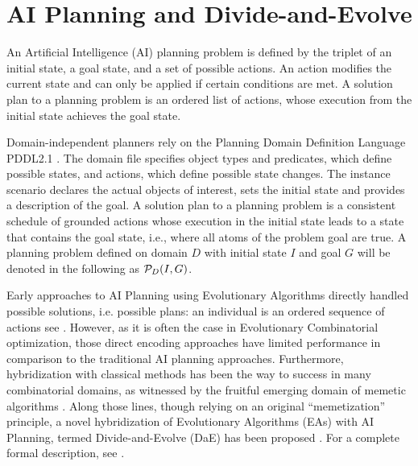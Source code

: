 \documentclass[runningheads,a4paper]{llncs}
\begin{document}
\section{AI Planning and Divide-and-Evolve}
\label{section:planning}

An Artificial Intelligence (AI) planning problem is defined by the triplet of an initial state, a goal state, and a set of possible actions. An action modifies the current state and can only be applied if certain conditions are met. A solution plan to a planning problem is an ordered list of actions, whose execution from the initial state achieves the goal state. 

Domain-independent planners rely on the Planning Domain Definition Language PDDL2.1 \cite{Fox-JAIR-2003}. The domain file specifies object types and predicates, which define possible states, and actions, which define possible state changes. The instance scenario declares the actual objects of interest, sets the initial state and provides a description of the goal. A solution plan to a planning problem is a consistent schedule of grounded actions whose execution in the initial state leads to a state that contains the goal state, i.e., where all atoms of the problem goal are true. A planning problem defined on domain $D$ with initial state $I$ and goal $G$ will be denoted in the following as ${\cal P}_D(I,G)$.

Early approaches to AI Planning using Evolutionary Algorithms directly handled possible solutions, i.e. possible plans: an individual is an ordered sequence of actions see \cite{Spector-AAAI-94,muslea97,westerberg:2000,westerberg:2001,Morignot-2005}. However, as it is often the case in Evolutionary Combinatorial optimization, those direct encoding approaches have limited performance in comparison to the traditional AI planning approaches. Furthermore, hybridization with classical methods has been the way to success in many combinatorial domains, as witnessed by the fruitful emerging domain of memetic algorithms \cite{MemeticBook:2005}. Along those lines, though relying on an original ``memetization'' principle, a novel hybridization of Evolutionary Algorithms (EAs) with AI Planning, termed Divide-and-Evolve (DaE) has been proposed \cite{DAE:EvoCOP06,DAE:book-2007}. For a complete formal description, see \cite{Bibai:ICAPS2010}.
\end{document}
